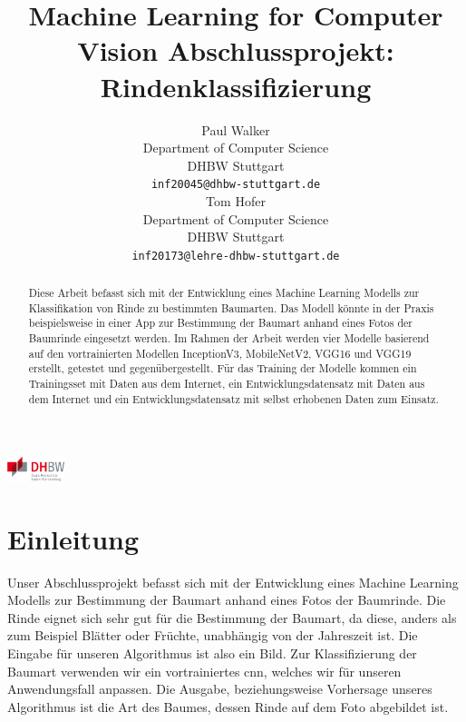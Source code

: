 \documentclass{article}
\title{Machine Learning for Computer Vision Abschlussprojekt: Rindenklassifizierung}
\author{
  Paul Walker\\
  Department of Computer Science\\
  DHBW Stuttgart\\
  \texttt{inf20045@dhbw-stuttgart.de} \\
  \And
  Tom Hofer\\
  Department of Computer Science\\
  DHBW Stuttgart\\
  \texttt{inf20173@lehre-dhbw-stuttgart.de} \\
}
\begin{document}
\begin{center}
\includegraphics[height=0.7cm]{dhbw_logo.png}
\end{center}

\maketitle

\begin{abstract}
  Diese Arbeit befasst sich mit der Entwicklung eines Machine Learning Modells zur Klassifikation von Rinde zu bestimmten Baumarten. 
  Das Modell könnte in der Praxis beispielsweise in einer App zur Bestimmung der Baumart anhand eines Fotos der Baumrinde eingesetzt werden. 
  Im Rahmen der Arbeit werden vier Modelle basierend auf den vortrainierten Modellen 
  InceptionV3, MobileNetV2, VGG16 und VGG19 erstellt, getestet und gegenübergestellt. 
  Für das Training der Modelle kommen ein Trainingsset mit Daten aus dem Internet, ein Entwicklungsdatensatz mit Daten aus dem Internet 
  und ein Entwicklungsdatensatz mit selbst erhobenen Daten zum Einsatz.
\end{abstract}

\section{Einleitung}
Unser Abschlussprojekt befasst sich mit der Entwicklung eines Machine Learning Modells zur Bestimmung der Baumart anhand eines Fotos der Baumrinde. Die Rinde eignet sich sehr gut für die Bestimmung der Baumart, da diese, anders als zum Beispiel Blätter oder Früchte, unabhängig von der Jahreszeit ist. Die Eingabe für unseren Algorithmus ist also ein Bild. Zur Klassifizierung der Baumart verwenden wir ein vortrainiertes \ac{cnn}, welches wir für unseren Anwendungsfall anpassen. Die Ausgabe, beziehungsweise Vorhersage unseres Algorithmus ist die Art des Baumes, dessen Rinde auf dem Foto abgebildet ist.
\end{document}
